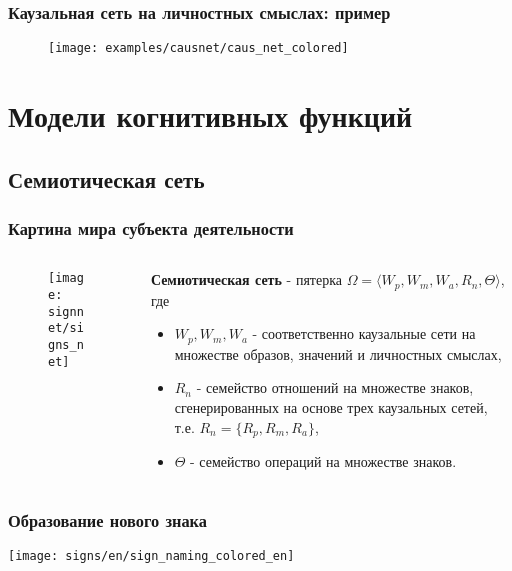 \documentclass[default]{beamer}
\begin{document}
	\begin{frame}
		\frametitle{Каузальная сеть на личностных смыслах: пример}
		
		\begin{figure}
			\texttt{[image: examples/causnet/caus\_net\_colored]}
		\end{figure}
		
	\end{frame}	

	\section{Модели когнитивных функций}
	\subsection{Семиотическая сеть}
	\begin{frame}
		\frametitle{Картина мира субъекта деятельности}
		
		\begin{columns}
			\begin{column}{0.55\textwidth}
				\begin{figure}
					\texttt{[image: signnet/signs\_net]}
				\end{figure}
			\end{column}
			\begin{column}{0.45\textwidth}
				\textbf{Семиотическая сеть} - пятерка $\Omega=\langle W_p, W_m, W_a, R_n, \Theta \rangle$, где
				\begin{itemize}
					\item $W_p, W_m, W_a$ - соответственно каузальные сети на множестве образов, значений и личностных смыслах,
					\item $R_n$ - семейство отношений на множестве знаков, сгенерированных на основе трех каузальных сетей, т.е. $R_n=\{R_p, R_m, R_a\}$,
					\item $\Theta$ - семейство операций на множестве знаков.
				\end{itemize}
			\end{column}
		\end{columns}
		\nocite{*}
		\printbibliography[keyword={symbsign}, resetnumbers=true]
	\end{frame}	
	
	\begin{frame}
		\frametitle{Образование нового знака}
		\centering
		\texttt{[image: signs/en/sign\_naming\_colored\_en]}
	\end{frame}		
\end{document}
